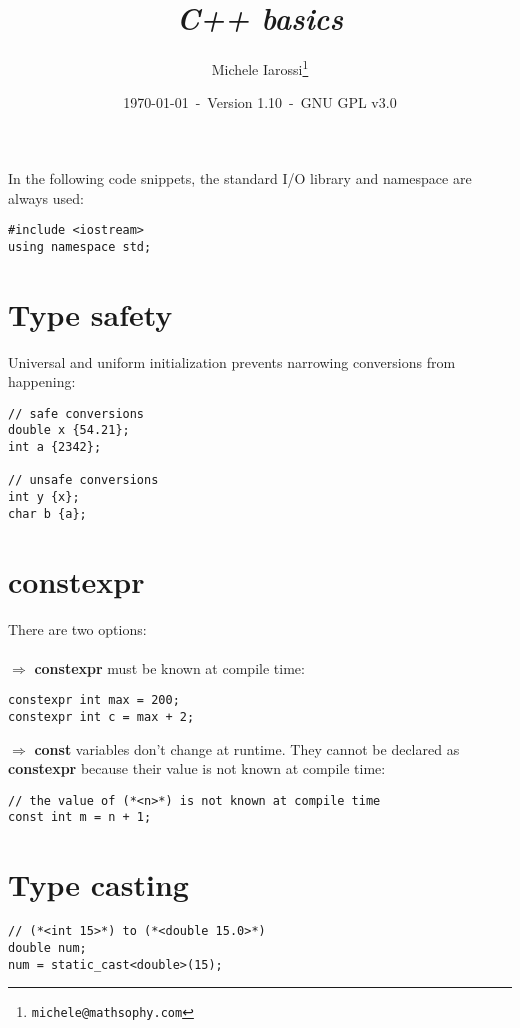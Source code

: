 \documentclass[10pt]{article}
\begin{document}
\title{\emph{C++ basics}}
\author{Michele Iarossi\thanks{\texttt{michele@mathsophy.com}}}
\date{\small \today~-~Version 1.10~-~GNU GPL v3.0}


\maketitle

\small

\begin{frame}{}
\setlength\columnsep{1cm}
\begin{multicols}{2}
  \tableofcontents
\end{multicols}
\end{frame}

\noindent
In the following code snippets, the standard I/O library and namespace are always used:
\begin{lstlisting}
#include <iostream>
using namespace std;
\end{lstlisting}
%
%
\section{Type safety}
\small
Universal and uniform initialization prevents narrowing
conversions from happening:
\begin{lstlisting}
// safe conversions
double x {54.21};
int a {2342};

// unsafe conversions
int y {x};
char b {a};
\end{lstlisting}
%
%
\section{constexpr}
\small
There are two options:\\ \\
$\Rightarrow$ \textbf{constexpr} must be known at compile time:
\begin{lstlisting}
constexpr int max = 200;
constexpr int c = max + 2;
\end{lstlisting}
$\Rightarrow$ \textbf{const} variables don't change at runtime. They cannot be declared as
\textbf{constexpr} because their value is not known at compile time:
\begin{lstlisting}
// the value of (*<n>*) is not known at compile time
const int m = n + 1;
\end{lstlisting}
%
%
\section{Type casting}
\small
\begin{lstlisting}
// (*<int 15>*) to (*<double 15.0>*)
double num;
num = static_cast<double>(15);
\end{lstlisting}
%
%
\end{document}
